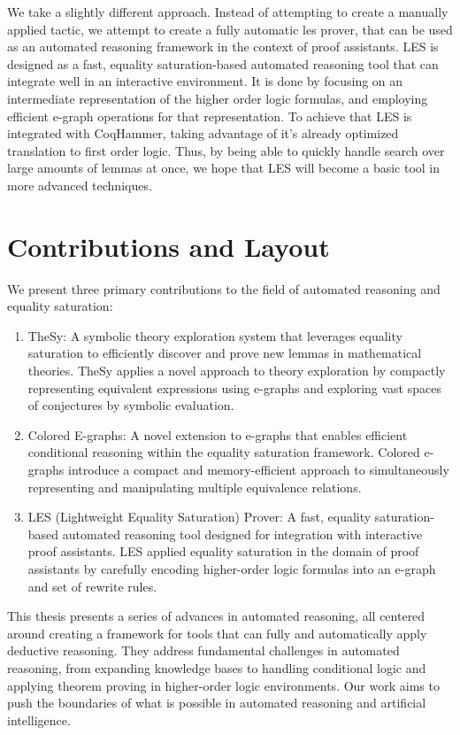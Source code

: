 We take a slightly different approach.
Instead of attempting to create a manually applied tactic, we attempt to create a fully automatic \gls{les} prover, that can be used as an automated reasoning framework in the context of proof assistants.
LES is designed as a fast, equality saturation-based automated reasoning tool that can integrate well in an interactive environment. 
It is done by focusing on an intermediate representation of the higher order logic formulas, and employing efficient e-graph operations for that representation.
To achieve that LES is integrated with CoqHammer, taking advantage of it's already optimized translation to first order logic.
Thus, by being able to quickly handle search over large amounts of lemmas at once, we hope that LES will become a basic tool in more advanced techniques.


\section{Contributions and Layout}

We present three primary contributions to the field of automated reasoning and equality saturation:

\begin{enumerate}
    \item TheSy: A symbolic theory exploration system that leverages equality saturation to efficiently discover and prove new lemmas in mathematical theories. 
    TheSy applies a novel approach to theory exploration by compactly representing equivalent expressions using e-graphs and exploring vast spaces of conjectures by symbolic evaluation.
    \item Colored E-graphs: A novel extension to e-graphs that enables efficient conditional reasoning within the equality saturation framework. 
    Colored e-graphs introduce a compact and memory-efficient approach to simultaneously representing and manipulating multiple equivalence relations.
    \item LES (Lightweight Equality Saturation) Prover: A fast, equality saturation-based automated reasoning tool designed for integration with interactive proof assistants. 
    LES applied equality saturation in the domain of proof assistants by carefully encoding higher-order logic formulas into an e-graph and set of rewrite rules.
\end{enumerate}

This thesis presents a series of advances in automated reasoning, all centered around creating a framework for tools that can fully and automatically apply deductive reasoning.
They address fundamental challenges in automated reasoning, from expanding knowledge bases to handling conditional logic and applying theorem proving in higher-order logic environments.
Our work aims to push the boundaries of what is possible in automated reasoning and artificial intelligence.

